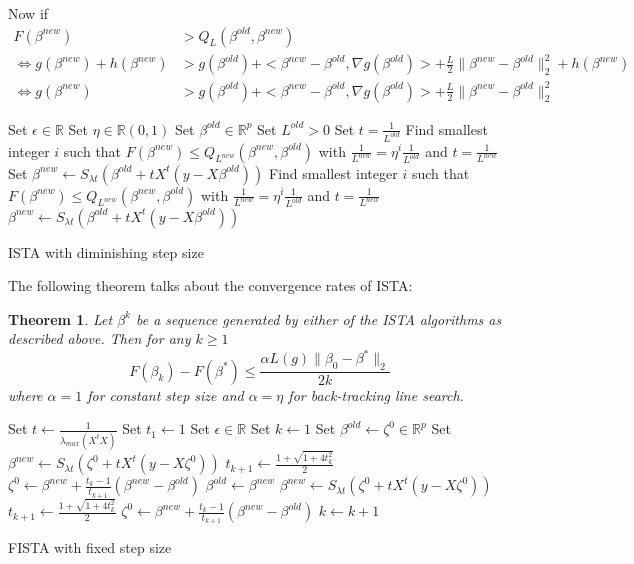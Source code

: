 \documentclass[12pt, leqno]{article}
\providecommand{\norm}[1]{\lVert#1\rVert} %
\newtheorem{thm}{Theorem}
\begin{document}
Now if 
\begin{align*}
F(\beta^{new}) &> Q_L(\beta^{old},\beta^{new}) \\
\iff g(\beta^{new}) + h(\beta^{new}) &> g(\beta^{old}) + <\beta^{new} - \beta^{old}, \nabla g (\beta^{old})> + \frac{L}{2} \norm{\beta^{new}-\beta^{old}}_2^2 + h(\beta^{new}) \\
\iff g(\beta^{new}) &> g(\beta^{old}) + <\beta^{new} - \beta^{old}, \nabla g (\beta^{old})> + \frac{L}{2} \norm{\beta^{new}-\beta^{old}}_2^2 
\end{align*}

\begin{algorithm}
\begin{algorithmic}
\State Set $\epsilon \in \mathbb{R}$
\State Set $\eta \in \mathbb{R}(0,1)$
\State Set $\beta^{old} \in \mathbb{R}^p$
\State Set $L^{old} > 0$
\State Set $t = \frac{1}{L^{old}}$
\State Find smallest integer $i$ such that $F(\beta^{new}) \leq Q_{L^{new}}(\beta^{new},\beta^{old})$ with $\frac{1}{L^{new}} = \eta^i \frac{1}{L^{old}}$ and $t = \frac{1}{L^{new}}$
\State Set $\beta^{new} \gets S_{\lambda t} (\beta^{old} + t X^t (y -
X \beta^{old}))$
\While {$\norm{\beta^{new} - \beta^{old}}_{\infty} \geq \epsilon$}
\State Find smallest integer $i$ such that $F(\beta^{new}) \leq Q_{L^{new}}(\beta^{new},\beta^{old})$ with $\frac{1}{L^{new}} = \eta^i \frac{1}{L^{old}}$ and $t = \frac{1}{L^{new}}$
   \State $\beta^{new} \gets S_{\lambda t} (\beta^{old} + t X^t (y -
X \beta^{old}))$
    \EndWhile
\end{algorithmic}
\caption{ISTA with diminishing step size}
\end{algorithm}

The following theorem talks about the convergence rates of ISTA:
\begin{thm}
Let $\beta^k$ be a sequence generated by either of the ISTA algorithms as described above. Then for any $k\geq 1$
$$
F(\beta_k) - F(\beta^*) \leq \frac{\alpha L(g) \norm{\beta_0 - \beta^*}_2}{2k}
$$
where $\alpha = 1$ for constant step size and $\alpha = \eta$ for back-tracking line search.
\end{thm}

\begin{algorithm}
\begin{algorithmic}
\State Set $t \gets \frac{1}{\lambda_{max}(X^t X)}$
\State Set $t_1 \gets 1$
\State Set $\epsilon \in \mathbb{R}$
\State Set $k \gets 1$
\State Set $\beta^{old} \gets \zeta^0 \in \mathbb{R}^p$
\State Set $\beta^{new} \gets S_{\lambda t} (\zeta^0 + t X^t (y -
X \zeta^0))$
\State $t_{k+1} \gets \frac{1 + \sqrt{1+4t_k^2}}{2}$
\State $\zeta^{0} \gets \beta^{new} + \frac{t_k-1}{t_{k+1}}(\beta^{new} - \beta^{old})$
\While {$\norm{\beta^{new} - \beta^{old}}_{\infty} \geq \epsilon$}
	\State $\beta^{old} \gets \beta^{new}$
   \State $\beta^{new} \gets S_{\lambda t} (\zeta^0 + t X^t (y -
X \zeta^{0}))$
\State $t_{k+1} \gets \frac{1 + \sqrt{1+4t_k^2}}{2}$
\State $\zeta^{0} \gets \beta^{new} + \frac{t_k-1}{t_{k+1}}(\beta^{new} - \beta^{old})$
\State $k \gets k+1$
    \EndWhile
\end{algorithmic}
\caption{FISTA with fixed step size}
\end{algorithm}
\end{document}
